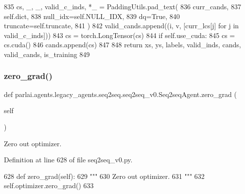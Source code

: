 \begin{DoxyCode}
835                     cs, \_, \_, valid\_c\_inds, *\_ = PaddingUtils.pad\_text(
836                         curr\_cands,
837                         self.dict,
838                         null\_idx=self.NULL\_IDX,
839                         dq=\textcolor{keyword}{True},
840                         truncate=self.truncate,
841                     )
842                     valid\_cands.append((i, v, [curr\_lcs[j] \textcolor{keywordflow}{for} j \textcolor{keywordflow}{in} valid\_c\_inds]))
843                     cs = torch.LongTensor(cs)
844                     \textcolor{keywordflow}{if} self.use\_cuda:
845                         cs = cs.cuda()
846                     cands.append(cs)
847 
848         \textcolor{keywordflow}{return} xs, ys, labels, valid\_inds, cands, valid\_cands, is\_training
849 
\end{DoxyCode}
\mbox{\label{classparlai_1_1agents_1_1legacy__agents_1_1seq2seq_1_1seq2seq__v0_1_1Seq2seqAgent_a0be9f1e378a403284d8afac5648fbf4d}} 
\subsubsection{\texorpdfstring{zero\+\_\+grad()}{zero\_grad()}}
{\footnotesize\ttfamily def parlai.\+agents.\+legacy\+\_\+agents.\+seq2seq.\+seq2seq\+\_\+v0.\+Seq2seq\+Agent.\+zero\+\_\+grad (\begin{DoxyParamCaption}\item[{}]{self }\end{DoxyParamCaption})}

\begin{DoxyVerb}Zero out optimizer.
\end{DoxyVerb}
 

Definition at line 628 of file seq2seq\+\_\+v0.\+py.


\begin{DoxyCode}
628     \textcolor{keyword}{def }zero\_grad(self):
629         \textcolor{stringliteral}{"""}
630 \textcolor{stringliteral}{        Zero out optimizer.}
631 \textcolor{stringliteral}{        """}
632         self.optimizer.zero\_grad()
633 
\end{DoxyCode}


